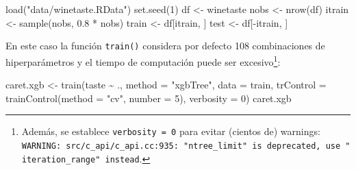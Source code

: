 \documentclass[
]{book}
\newenvironment{Shaded}{\begin{snugshade}}{\end{snugshade}}
\newcommand{\AttributeTok}[1]{\textcolor[rgb]{0.77,0.63,0.00}{#1}}
\newcommand{\DecValTok}[1]{\textcolor[rgb]{0.00,0.00,0.81}{#1}}
\newcommand{\FloatTok}[1]{\textcolor[rgb]{0.00,0.00,0.81}{#1}}
\newcommand{\FunctionTok}[1]{\textcolor[rgb]{0.00,0.00,0.00}{#1}}
\newcommand{\NormalTok}[1]{#1}
\newcommand{\OtherTok}[1]{\textcolor[rgb]{0.56,0.35,0.01}{#1}}
\newcommand{\SpecialCharTok}[1]{\textcolor[rgb]{0.00,0.00,0.00}{#1}}
\newcommand{\StringTok}[1]{\textcolor[rgb]{0.31,0.60,0.02}{#1}}
\theoremstyle{break}
\theoremstyle{nonumberplain}
\begin{document}
\begin{Shaded}
\begin{Highlighting}[]
\FunctionTok{load}\NormalTok{(}\StringTok{"data/winetaste.RData"}\NormalTok{)}
\FunctionTok{set.seed}\NormalTok{(}\DecValTok{1}\NormalTok{)}
\NormalTok{df }\OtherTok{\textless{}{-}}\NormalTok{ winetaste}
\NormalTok{nobs }\OtherTok{\textless{}{-}} \FunctionTok{nrow}\NormalTok{(df)}
\NormalTok{itrain }\OtherTok{\textless{}{-}} \FunctionTok{sample}\NormalTok{(nobs, }\FloatTok{0.8} \SpecialCharTok{*}\NormalTok{ nobs)}
\NormalTok{train }\OtherTok{\textless{}{-}}\NormalTok{ df[itrain, ]}
\NormalTok{test }\OtherTok{\textless{}{-}}\NormalTok{ df[}\SpecialCharTok{{-}}\NormalTok{itrain, ]}
\end{Highlighting}
\end{Shaded}

En este caso la función \texttt{train()} considera por defecto 108 combinaciones de hiperparámetros y el tiempo de computación puede ser excesivo\footnote{Además, se establece \texttt{verbosity\ =\ 0} para evitar (cientos de) warnings:
  \texttt{WARNING:\ src/c\_api/c\_api.cc:935:\ "ntree\_limit"\ is\ deprecated,\ use\ "iteration\_range"\ instead}.}:

\begin{Shaded}
\begin{Highlighting}[]
\NormalTok{caret.xgb }\OtherTok{\textless{}{-}} \FunctionTok{train}\NormalTok{(taste }\SpecialCharTok{\textasciitilde{}}\NormalTok{ ., }\AttributeTok{method =} \StringTok{"xgbTree"}\NormalTok{, }\AttributeTok{data =}\NormalTok{ train,}
                   \AttributeTok{trControl =} \FunctionTok{trainControl}\NormalTok{(}\AttributeTok{method =} \StringTok{"cv"}\NormalTok{, }\AttributeTok{number =} \DecValTok{5}\NormalTok{), }
                   \AttributeTok{verbosity =} \DecValTok{0}\NormalTok{)}
\NormalTok{caret.xgb}
\end{Highlighting}
\end{Shaded}
\end{document}
